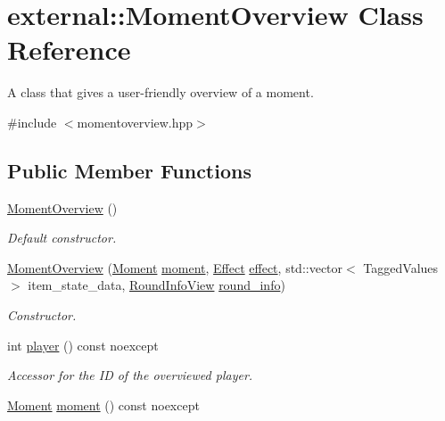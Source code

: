 \hypertarget{classexternal_1_1_moment_overview}{}\section{external\+:\+:Moment\+Overview Class Reference}
\label{classexternal_1_1_moment_overview}


A class that gives a user-\/friendly overview of a moment.  




{\ttfamily \#include $<$momentoverview.\+hpp$>$}

\subsection*{Public Member Functions}
\begin{DoxyCompactItemize}
\item 
\hyperlink{classexternal_1_1_moment_overview_aabe55b10c977be45ba2574c606676c87}{Moment\+Overview} ()
\begin{DoxyCompactList}\small\item\em Default constructor. \end{DoxyCompactList}\item 
\hyperlink{classexternal_1_1_moment_overview_af03a8f31dfc944daf5d54477b1acab26}{Moment\+Overview} (\hyperlink{classtimeplane_1_1_moment}{Moment} \hyperlink{classexternal_1_1_moment_overview_a6aaebaf6107f40bfb22a15f82c92e131}{moment}, \hyperlink{classitem_1_1_effect}{Effect} \hyperlink{classexternal_1_1_moment_overview_abeb27fa11c351eea2c90679842895497}{effect}, std\+::vector$<$ Tagged\+Values $>$ item\+\_\+state\+\_\+data, \hyperlink{classroundinfo_1_1_round_info_view}{Round\+Info\+View} \hyperlink{classexternal_1_1_moment_overview_a186a205fd74b30b627b82bf837b78f79}{round\+\_\+info})
\begin{DoxyCompactList}\small\item\em Constructor. \end{DoxyCompactList}\item 
int \hyperlink{classexternal_1_1_moment_overview_afb04d3b50661c06510b77e73d66e70ac}{player} () const noexcept
\begin{DoxyCompactList}\small\item\em Accessor for the ID of the overviewed player. \end{DoxyCompactList}\item 
\hyperlink{classtimeplane_1_1_moment}{Moment} \hyperlink{classexternal_1_1_moment_overview_a6aaebaf6107f40bfb22a15f82c92e131}{moment} () const noexcept

\end{DoxyCompactItemize}
